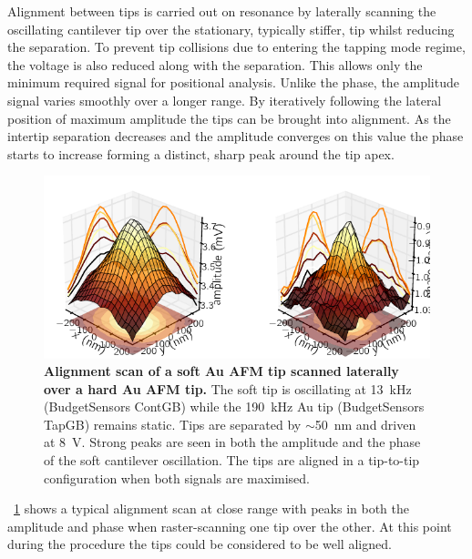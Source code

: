 \documentclass{article}
\begin{document}
Alignment between tips is carried out on resonance by laterally scanning the oscillating cantilever tip over the stationary, typically stiffer, tip whilst reducing the separation. To prevent tip collisions due to entering the tapping mode regime, the voltage is also reduced along with the separation. This allows only the minimum required signal for positional analysis. Unlike the phase, the amplitude signal varies smoothly over a longer range. By iteratively following the lateral position of maximum amplitude the tips can be brought into alignment. As the intertip separation decreases and the amplitude converges on this value the phase starts to increase forming a distinct, sharp peak around the tip apex.

\begin{figure}[h]
\centering
\includegraphics{figures/alignment_scan}
\caption[Alignment scan of a soft Au AFM tip scanned laterally over a hard Au AFM tip]{\textbf{Alignment scan of a soft Au AFM tip scanned laterally over a hard Au AFM tip.} The soft tip is oscillating at \SI{13}{kHz} (BudgetSensors ContGB) while the \SI{190}{kHz} Au tip (BudgetSensors TapGB) remains static. Tips are separated by $\sim$\SI{50}{nm} and driven at \SI{8}{V}. Strong peaks are seen in both the amplitude and the phase of the soft cantilever oscillation. The tips are aligned in a tip-to-tip configuration when both signals are maximised.}
\label{fig:alignment_scan} 
\end{figure}

\figurename~\ref{fig:alignment_scan} shows a typical alignment scan at close range with peaks in both the amplitude and phase when raster-scanning one tip over the other. At this point during the procedure the tips could be considered to be well aligned.
\end{document}
